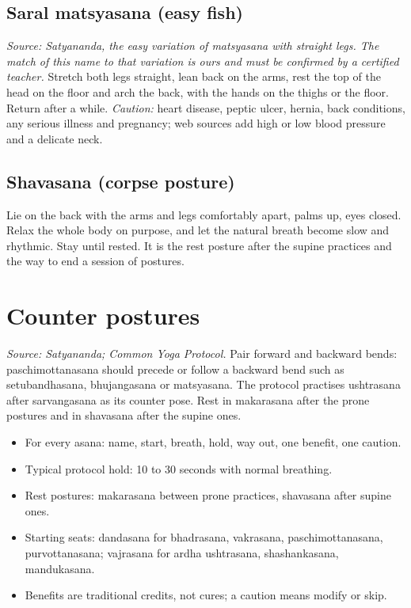 \subsection*{Saral matsyasana (easy fish)}
\textit{Source: Satyananda, the easy variation of matsyasana with straight legs. The match of this name to that variation is ours and must be confirmed by a certified teacher.} Stretch both legs straight, lean back on the arms, rest the top of the head on the floor and arch the back, with the hands on the thighs or the floor. Return after a while.
\textit{Caution:} heart disease, peptic ulcer, hernia, back conditions, any serious illness and pregnancy; web sources add high or low blood pressure and a delicate neck.

\subsection*{Shavasana (corpse posture)}
Lie on the back with the arms and legs comfortably apart, palms up, eyes closed. Relax the whole body on purpose, and let the natural breath become slow and rhythmic. Stay until rested. It is the rest posture after the supine practices and the way to end a session of postures.

\section{Counter postures}

\textit{Source: Satyananda; Common Yoga Protocol.} Pair forward and backward bends: paschimottanasana should precede or follow a backward bend such as setubandhasana, bhujangasana or matsyasana. The protocol practises ushtrasana after sarvangasana as its counter pose. Rest in makarasana after the prone postures and in shavasana after the supine ones.


\begin{recall}
\begin{itemize}
\item For every asana: name, start, breath, hold, way out, one benefit, one caution.
\item Typical protocol hold: 10 to 30 seconds with normal breathing.
\item Rest postures: makarasana between prone practices, shavasana after supine ones.
\item Starting seats: dandasana for bhadrasana, vakrasana, paschimottanasana, purvottanasana; vajrasana for ardha ushtrasana, shashankasana, mandukasana.
\item Benefits are traditional credits, not cures; a caution means modify or skip.
\end{itemize}
\end{recall}

